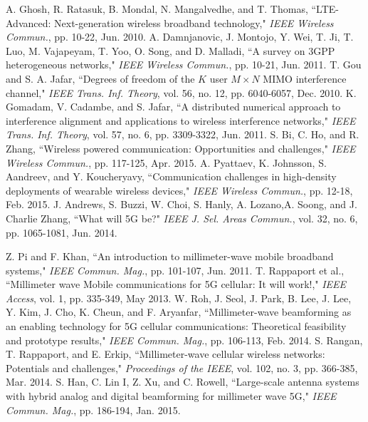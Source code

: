 \documentclass[11pt,draftcls,onecolumn]{IEEEtran}
\begin{document}
%

\begin{small}
\begin{thebibliography}{30}
A. Ghosh, R. Ratasuk, B. Mondal, N. Mangalvedhe, and T. Thomas, ``LTE-Advanced: Next-generation wireless broadband technology," \emph{IEEE Wireless Commun.}, pp. 10-22, Jun. 2010.
A. Damnjanovic, J. Montojo, Y.  Wei, T. Ji, T. Luo, M. Vajapeyam, T. Yoo, O. Song, and D. Malladi, ``A survey on 3GPP heterogeneous networks," \emph{IEEE Wireless Commun.}, pp. 10-21, Jun. 2011.
T. Gou and S. A. Jafar, ``Degrees of freedom of the $K$ user $M\times N$ MIMO interference channel," \emph{IEEE Trans. Inf. Theory}, vol. 56, no. 12, pp. 6040-6057, Dec. 2010.
K. Gomadam, V. Cadambe, and S. Jafar, ``A distributed numerical approach to interference alignment and applications to wireless interference networks," \emph{IEEE Trans. Inf. Theory}, vol. 57, no. 6, pp. 3309-3322, Jun. 2011.
S. Bi, C. Ho, and R. Zhang, ``Wireless powered communication: Opportunities and challenges," \emph{IEEE Wireless Commun.},  pp. 117-125, Apr. 2015.
A. Pyattaev, K. Johnsson, S. Aandreev, and Y. Koucheryavy, ``Communication challenges in high-density deployments of wearable wireless devices," \emph{IEEE Wireless Commun.}, pp. 12-18, Feb. 2015.
J. Andrews, S. Buzzi, W. Choi, S. Hanly, A. Lozano,A. Soong, and J. Charlie Zhang, ``What will 5G be?" \emph{IEEE J. Sel. Areas Commun.}, vol. 32, no. 6, pp. 1065-1081, Jun. 2014.

Z. Pi and F. Khan, ``An introduction to millimeter-wave mobile broadband systems," \emph{IEEE Commun. Mag.}, pp. 101-107, Jun. 2011.
T. Rappaport et al., ``Millimeter wave Mobile communications for 5G cellular: It will work!," \emph{IEEE Access}, vol. 1, pp. 335-349, May 2013.
W. Roh, J. Seol, J. Park, B. Lee, J. Lee, Y. Kim, J. Cho, K. Cheun, and F. Aryanfar, ``Millimeter-wave beamforming as an enabling technology for 5G cellular communications: Theoretical feasibility and prototype results," \emph{IEEE Commun. Mag.}, pp. 106-113, Feb. 2014.
S. Rangan, T. Rappaport, and E. Erkip, ``Millimeter-wave cellular wireless networks: Potentials and challenges," \emph{Proceedings of the IEEE}, vol. 102, no. 3, pp. 366-385, Mar. 2014.
S. Han, C. Lin I, Z. Xu, and C. Rowell, ``Large-scale antenna systems with hybrid analog and digital beamforming for millimeter wave 5G," \emph{IEEE Commun. Mag.}, pp. 186-194, Jan. 2015.


\end{thebibliography}
\end{small}
\end{document}
